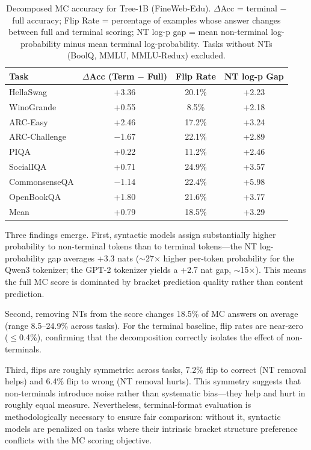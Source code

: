 \documentclass[11pt]{article}
\begin{document}
\begin{table}[htbp]
  \centering
  \begin{tabular}{lccc}
    \toprule
    Task & $\Delta$Acc (Term $-$ Full) & Flip Rate & NT log-p Gap \\
    \midrule
    HellaSwag & +3.36 & 20.1\% & +2.23 \\
    WinoGrande & +0.55 & 8.5\% & +2.18 \\
    ARC-Easy & +2.46 & 17.2\% & +3.24 \\
    ARC-Challenge & $-$1.67 & 22.1\% & +2.89 \\
    PIQA & +0.22 & 11.2\% & +2.46 \\
    SocialIQA & +0.71 & 24.9\% & +3.57 \\
    CommonsenseQA & $-$1.14 & 22.4\% & +5.98 \\
    OpenBookQA & +1.80 & 21.6\% & +3.77 \\
    \midrule
    Mean & +0.79 & 18.5\% & +3.29 \\
    \bottomrule
  \end{tabular}
  \caption{Decomposed MC accuracy for Tree-1B (FineWeb-Edu). $\Delta$Acc = terminal $-$ full accuracy; Flip Rate = percentage of examples whose answer changes between full and terminal scoring; NT log-p gap = mean non-terminal log-probability minus mean terminal log-probability. Tasks without NTs (BoolQ, MMLU, MMLU-Redux) excluded.}
  \label{tab:decom}
\end{table}

Three findings emerge.
First, syntactic models assign substantially higher probability to non-terminal tokens than to terminal tokens---the NT log-probability gap averages +3.3 nats ($\sim$27$\times$ higher per-token probability for the Qwen3 tokenizer; the GPT-2 tokenizer yields a +2.7 nat gap, $\sim$15$\times$).
This means the full MC score is dominated by bracket prediction quality rather than content prediction.

Second, removing NTs from the score changes 18.5\% of MC answers on average (range 8.5--24.9\% across tasks).
For the terminal baseline, flip rates are near-zero ($\le$0.4\%), confirming that the decomposition correctly isolates the effect of non-terminals.

Third, flips are roughly symmetric: across tasks, 7.2\% flip to correct (NT removal helps) and 6.4\% flip to wrong (NT removal hurts).
This symmetry suggests that non-terminals introduce noise rather than systematic bias---they help and hurt in roughly equal measure.
Nevertheless, terminal-format evaluation is methodologically necessary to ensure fair comparison: without it, syntactic models are penalized on tasks where their intrinsic bracket structure preference conflicts with the MC scoring objective.
\end{document}

